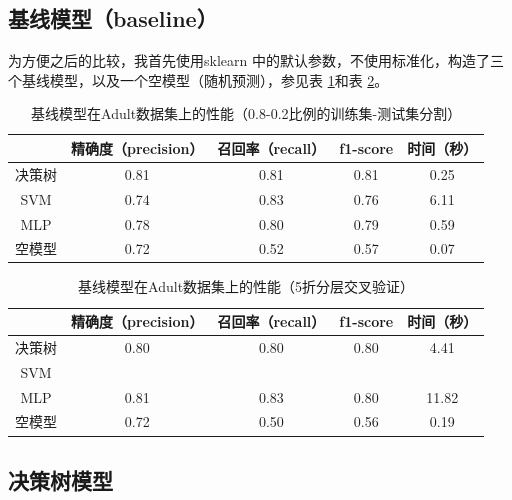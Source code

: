 \documentclass[12pt,a4paper]{article}
\theoremstyle{definition}
\begin{document}
\subsection{基线模型（baseline）}

为方便之后的比较，我首先使用sklearn \cite{sklearn}中的默认参数，不使用标准化，构造了三个基线模型，以及一个空模型（随机预测），参见表 \ref{tab:baselines1}和表 \ref{tab:baselines2}。

\begin{table}[H]
	\renewcommand\arraystretch{1.35}
	\caption{基线模型在Adult数据集上的性能（0.8-0.2比例的训练集-测试集分割）}
	\label{tab:baselines1}
	\centering
	
	\begin{tabular}{c|c|c|c|c}
		\centering
		 & 精确度（precision） & 召回率（recall） & f1-score & 时间（秒） \\
		\hline
		\hline
		
		决策树 & 0.81 & 0.81 & 0.81 & 0.25 \\
		SVM & 0.74 & 0.83 & 0.76 & 6.11 \\
		MLP & 0.78 & 0.80 & 0.79 & 0.59 \\
		空模型 & 0.72 & 0.52 & 0.57 & 0.07 \\

	\end{tabular}
\end{table}

\begin{table}[H]
	\renewcommand\arraystretch{1.35}
	\caption{基线模型在Adult数据集上的性能（5折分层交叉验证）}
	\label{tab:baselines2}
	\centering
	
	\begin{tabular}{c|c|c|c|c}
		\centering
		 & 精确度（precision） & 召回率（recall） & f1-score & 时间（秒） \\
		\hline
		\hline
		
		决策树 & 0.80 & 0.80 & 0.80 & 4.41 \\
		SVM & & & & \\
		MLP & 0.81 & 0.83 & 0.80 & 11.82 \\
		空模型 & 0.72 & 0.50 & 0.56 & 0.19 \\

	\end{tabular}
\end{table}

\subsection{决策树模型}
\end{document}
